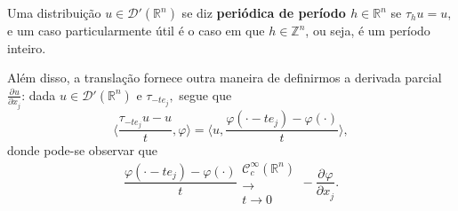 \documentclass[../distribution_theory_notes.tex]{subfiles}
\begin{document}
\begin{tcolorbox}[
		skin=enhanced,
		title=Observação,
		fonttitle=\bfseries,
		colframe=black,
		colbacktitle=cyan!75!white,
		colback=cyan!15,
		colbacklower=black,
		coltitle=black,
		drop fuzzy shadow,
	]
	Uma distribuição \(u\in \mathcal{D}'(\mathbb{R}^{n})\) se diz \textbf{periódica de período \(h\in \mathbb{R}^{n}\)} se \(\tau_h u = u\), e um caso particularmente útil é o caso em que \(h\in \mathbb{Z}^{n}\), ou seja, é um período inteiro.
\end{tcolorbox}
\begin{tcolorbox}[
		skin=enhanced,
		title=Observação,
		fonttitle=\bfseries,
		colframe=black,
		colbacktitle=cyan!75!white,
		colback=cyan!15,
		colbacklower=black,
		coltitle=black,
		drop fuzzy shadow,
	]
	Além disso, a translação fornece outra maneira de definirmos a derivada parcial \(\frac{\partial^{}u}{\partial x_{j}^{}}\): dada \(u\in \mathcal{D}'(\mathbb{R}^{n})\) e \(\tau_{-te_{j}},\) segue que
	\[
		\biggl\langle \frac{\tau_{-te_{j}}u - u}{t}, \varphi  \biggr\rangle = \biggl\langle u, \frac{\varphi (\cdot -te_{j}) - \varphi (\cdot )}{t} \biggr\rangle,
	\]
	donde pode-se observar que
	\[
		\frac{\varphi (\cdot -te_{j}) - \varphi (\cdot )}{t} \substack{\mathcal{C}_{c}^{\infty}(\mathbb{R}^{n}) \\ \longrightarrow \\ t\to 0} - \frac{\partial^{}\varphi }{\partial x_{j}^{}}.
	\]
\end{tcolorbox}
\end{document}
